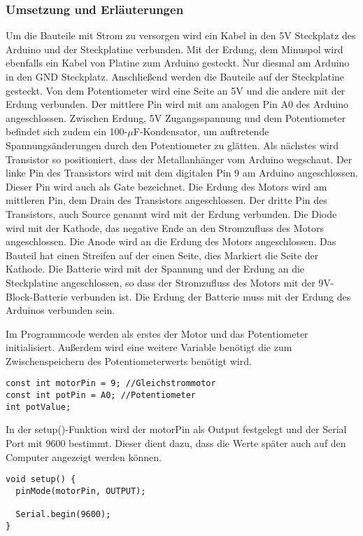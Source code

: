 \subsubsection{Umsetzung und Erläuterungen}
Um die Bauteile mit Strom zu versorgen wird ein Kabel in den 5V Steckplatz des Arduino und der Steckplatine verbunden. Mit der Erdung, dem Minuspol wird ebenfalls ein Kabel von Platine zum Arduino gesteckt. Nur diesmal am Arduino in den GND Steckplatz. Anschließend werden die Bauteile auf der Steckplatine gesteckt. Von dem Potentiometer wird eine Seite an 5V und die andere mit der Erdung verbunden. Der mittlere Pin wird mit am analogen Pin A0 des Arduino angeschlossen. Zwischen Erdung, 5V Zugangsspannung und dem Potentiometer befindet sich zudem ein 100-$\mu$F-Kondensator, um auftretende Spannungsänderungen durch den Potentiometer zu glätten. Als nächstes wird Transistor so positioniert, dass der Metallanhänger vom Arduino wegschaut. Der linke Pin des Transistors wird mit dem digitalen Pin 9 am Arduino angeschlossen. Dieser Pin wird auch als Gate bezeichnet. Die Erdung des Motors wird am mittleren Pin, dem Drain des Transistors angeschlossen. Der dritte Pin des Transistors, auch Source genannt wird mit der Erdung verbunden. Die Diode wird mit der Kathode, das negative Ende an den Stromzufluss des Motors angeschlossen. Die Anode wird an die Erdung des Motors angeschlossen. Das Bauteil hat einen Streifen auf der einen Seite, dies Markiert die Seite der Kathode. Die Batterie wird mit der Spannung und der Erdung an die Steckplatine angeschlossen, so dass der Stromzufluss des Motors mit der 9V-Block-Batterie verbunden ist. Die Erdung der Batterie muss mit der Erdung des Arduinos verbunden sein.

Im Programmcode werden als erstes der Motor und das Potentiometer initialisiert. Außerdem wird eine weitere Variable benötigt die zum Zwischenspeichern des Potentiometerwerts benötigt wird.
\begin{lstlisting}[language=Arduino]
const int motorPin = 9; //Gleichstrommotor
const int potPin = A0; //Potentiometer
int potValue;
\end{lstlisting}

In der setup()-Funktion wird der motorPin als Output festgelegt und der Serial Port mit 9600 bestimmt. Dieser dient dazu, dass die Werte später auch auf den Computer angezeigt werden können.
\begin{lstlisting}[language=Arduino]
void setup() {
  pinMode(motorPin, OUTPUT);

  Serial.begin(9600);
}
\end{lstlisting}

